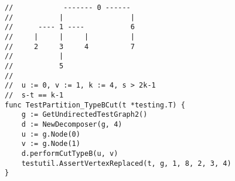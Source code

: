 \begin{lstlisting}[caption=A test for Decompose Cut type B,label=lst:decompose_test,float,floatplacement=H]
//            ------- 0 ------
//           |                |
//      ---- 1 ----           6
//     |     |     |          |
//     2     3     4          7
//           |
//           5
//
//  u := 0, v := 1, k := 4, s > 2k-1
//  s-t == k-1
func TestPartition_TypeBCut(t *testing.T) {
    g := GetUndirectedTestGraph2()
    d := NewDecomposer(g, 4)
    u := g.Node(0)
    v := g.Node(1)
    d.performCutTypeB(u, v)
    testutil.AssertVertexReplaced(t, g, 1, 8, 2, 3, 4)
}
\end{lstlisting}